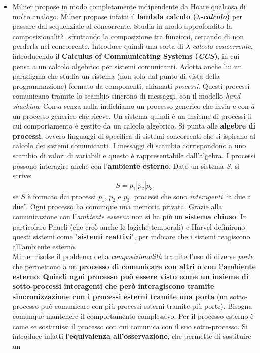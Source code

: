 \begin{itemize}
    \item 
    Milner propose in modo completamente indipendente da Hoare qualcosa di molto
analogo. Milner propose infatti il \textbf{lambda calcolo
  (\textit{$\lambda$-calcolo})} per passare dal sequenziale al
concorrente. Studia in modo approfondito la composizionalità, sfruttando la
composizione tra funzioni, cercando di non perderla nel concorrente. Introduce
quindi una sorta di \textit{$\lambda$-calcolo concorrente}, introducendo il
\textbf{Calculus of Communicating Systems (\textit{CCS})}, in cui pensa a un
calcolo algebrico per sistemi comunicanti. Adotta anche lui un paradigma che
studia un sistema (non solo dal punto di vista della programmazione) formato da
componenti, chiamati \textit{processi}. Questi processi comunicano tramite lo
scambio sincrono di messaggi, con il modello \textit{hand-shacking}. Con $a$
senza nulla indichiamo un processo generico che invia e con $\overline{a}$ un processo generico che riceve. Un sistema quindi è un insieme di processi il cui comportamento è gestito da un
calcolo algebrico. Si punta alle \textbf{algebre di processi}, ovvero
linguaggi di specifica di sistemi concorrenti che si ispirano al calcolo dei
sistemi comunicanti. I messaggi di scambio corrispondono a uno scambio di
valori di variabili e questo è rappresentabile dall'algebra. I processi possono
interagire anche con l'\textbf{ambiente esterno}. Dato un sistema $S$, si
scrive:
\[S=p_1|p_2|p_3\]
se $S$ è formato dai processi $p_1$, $p_2$ e $p_3$, processi che sono
\textit{interagenti} ``a due a due''. Ogni processo ha comunque una memoria
privata. Grazie alla comunicazione con l'\textit{ambiente esterno} non si ha più un
\textbf{sistema chiuso}. In particolare Pnueli (che creò anche le logiche temporali) e Harvel
definirono questi sistemi come "\textbf{sistemi reattivi}", per indicare che i
sistemi reagiscono all'ambiente esterno. \\ Milner risolse il problema della \textit{composizionalità} tramite l'uso di
diverse \textit{porte} che permettono a un \textbf{processo di comunicare con altri o
con l'ambiente esterno}. \textbf{Quindi ogni processo può essere visto come un insieme di
sotto-processi interagenti che però interagiscono tramite
sincronizzazione con i processi esterni tramite una porta} (un sotto-processo può
comunicare con più processi esterni tramite più porte). Bisogna comunque
mantenere il comportamento complessivo. Per il processo esterno è come se
sostituissi il processo con cui comunica con il suo sotto-processo. Si introduce
infatti l'\textbf{equivalenza all'osservazione}, che permette di sostituire un

\end{itemize}
